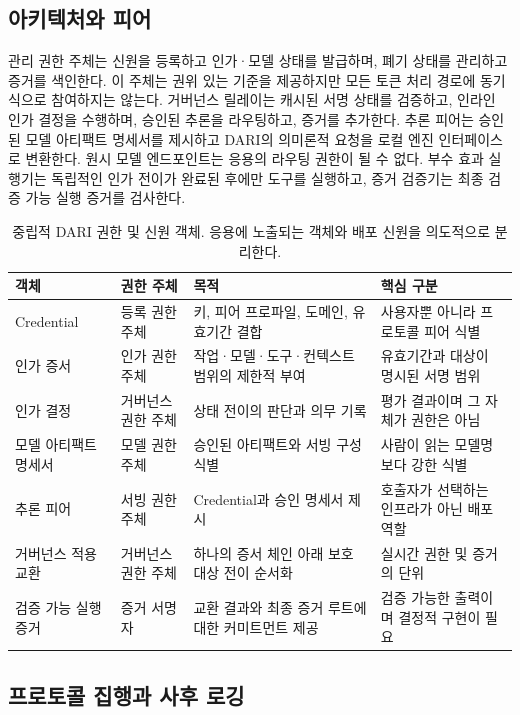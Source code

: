 \documentclass[10pt]{article}
\begin{document}
\subsection{아키텍처와 피어}

관리 권한 주체는 신원을 등록하고 인가·모델 상태를 발급하며, 폐기 상태를 관리하고 증거를 색인한다. 이 주체는 권위 있는 기준을 제공하지만 모든 토큰 처리 경로에 동기식으로 참여하지는 않는다. 거버넌스 릴레이는 캐시된 서명 상태를 검증하고, 인라인 인가 결정을 수행하며, 승인된 추론을 라우팅하고, 증거를 추가한다. 추론 피어는 승인된 모델 아티팩트 명세서를 제시하고 DARI의 의미론적 요청을 로컬 엔진 인터페이스로 변환한다. 원시 모델 엔드포인트는 응용의 라우팅 권한이 될 수 없다. 부수 효과 실행기는 독립적인 인가 전이가 완료된 후에만 도구를 실행하고, 증거 검증기는 최종 검증 가능 실행 증거를 검사한다.

\begin{table}[t]
\centering
\caption{중립적 DARI 권한 및 신원 객체. 응용에 노출되는 객체와 배포 신원을 의도적으로 분리한다.}
\label{tab:objects}
\small
\begin{tabularx}{\textwidth}{@{}l l Y Y@{}}
\toprule
객체 & 권한 주체 & 목적 & 핵심 구분 \\
\midrule
Credential & 등록 권한 주체 & 키, 피어 프로파일, 도메인, 유효기간 결합 & 사용자뿐 아니라 프로토콜 피어 식별 \\
인가 증서 & 인가 권한 주체 & 작업·모델·도구·컨텍스트 범위의 제한적 부여 & 유효기간과 대상이 명시된 서명 범위 \\
인가 결정 & 거버넌스 권한 주체 & 상태 전이의 판단과 의무 기록 & 평가 결과이며 그 자체가 권한은 아님 \\
모델 아티팩트 명세서 & 모델 권한 주체 & 승인된 아티팩트와 서빙 구성 식별 & 사람이 읽는 모델명보다 강한 식별 \\
추론 피어 & 서빙 권한 주체 & Credential과 승인 명세서 제시 & 호출자가 선택하는 인프라가 아닌 배포 역할 \\
거버넌스 적용 교환 & 거버넌스 권한 주체 & 하나의 증서 체인 아래 보호 대상 전이 순서화 & 실시간 권한 및 증거의 단위 \\
검증 가능 실행 증거 & 증거 서명자 & 교환 결과와 최종 증거 루트에 대한 커미트먼트 제공 & 검증 가능한 출력이며 결정적 구현이 필요 \\
\bottomrule
\end{tabularx}
\end{table}

\subsection{프로토콜 집행과 사후 로깅}
\end{document}
